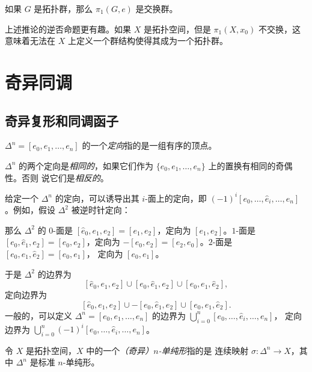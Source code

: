 \documentclass[fontset=none]{Notes}
\begin{document}
\begin{corollary}
  如果 $G$ 是拓扑群，那么 $\pi_1(G,e)$ 是交换群。
\end{corollary}

上述推论的逆否命题更有趣。如果 $X$ 是拓扑空间，但是 $\pi_1(X,x_0)$
不交换，这意味着无法在 $X$ 上定义一个群结构使得其成为一个拓扑群。

\chapter{奇异同调}

\section{奇异复形和同调函子}

\begin{definition}
  $\Delta^n=[e_0,e_1,\dots,e_n]$ 的一个\emph{定向}指的是一组有序的顶点。
\end{definition}

\begin{definition}
  $\Delta^n$ 的两个定向是\emph{相同的}，如果它们作为
  $\{e_0,e_1,\dots,e_n\}$ 上的置换有相同的奇偶性。否则
  说它们是\emph{相反的}。
\end{definition}

给定一个 $\Delta^n$ 的定向，可以诱导出其 $i$-面上的定向，即
$(-1)^i[e_0,\dots,\hat e_i,\dots,e_n]$。例如，假设 $\Delta^2$
被逆时针定向：
\begin{center}
\end{center}
那么 $\Delta^2$ 的 $0$-面是 $[\hat e_0,e_1,e_2]=[e_1,e_2]$，定向为
$[e_1,e_2]$。$1$-面是 $[e_0,\hat e_1,e_2]=[e_0,e_2]$，定向为
$-[e_0,e_2]=[e_2,e_0]$。$2$-面是 $[e_0,e_1,\hat e_2]=[e_0,e_1]$，
定向为 $[e_0,e_1]$。

于是 $\Delta^2$ 的边界为 
\[
  [\hat e_0,e_1,e_2]\cup [e_0,\hat e_1,e_2]\cup [e_0,e_1,\hat e_2],
\]
定向边界为
\[
  [\hat e_0,e_1,e_2]\cup -[e_0,\hat e_1,e_2]\cup [e_0,e_1,\hat e_2].
\]
一般的，可以定义 $\Delta^n=[e_0,e_1,\dots,e_n]$ 的边界为
$\bigcup_{i=0}^n [e_0,\dots,\hat e_i,\dots,e_n]$，
定向边界为 $\bigcup_{i=0}^n (-1)^i[e_0,\dots,\hat e_i,\dots,e_n]$。

\begin{definition}
  令 $X$ 是拓扑空间，$X$ 中的一个\emph{（奇异）$n$-单纯形}指的是
  连续映射 $\sigma:\Delta^n\to X$，其中 $\Delta^n$ 是标准 $n$-单纯形。
\end{definition}
\end{document}

